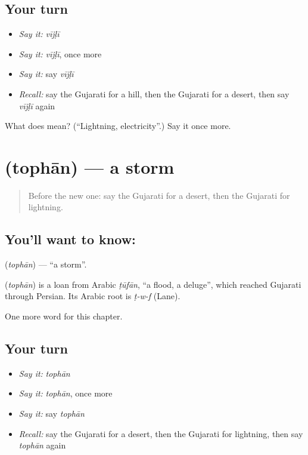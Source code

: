 \subsection*{Your turn}
\begin{itemize}
\raggedright
  \item \emph{Say it:} \emph{vījḷī}
  \item \emph{Say it:} \emph{vījḷī}, once more
  \item \emph{Say it:} say \emph{vījḷī}
  \item \emph{Recall:} say the Gujarati for a hill, then the Gujarati for a desert, then say \emph{vījḷī} again
\end{itemize}

\begin{tcolorbox}[breakable,colback=teal!4,colframe=teal!35!black,title={Before you move on}]
What does  mean? (\textquotedblleft{}Lightning, electricity\textquotedblright{}.) Say it once more.
\end{tcolorbox}
\section[\texorpdfstring{\gu{તોફાન} (tophān)}{તોફાન (tophān)}]{ (tophān) — a storm}

\label{lesson:GU-C120-tophan}



\begin{quote}
Before the new one: say the Gujarati for a desert, then the Gujarati for lightning.
\end{quote}

\subsection*{You'll want to know: }
\textbf{} (\emph{tophān}) — \textquotedblleft{}a storm\textquotedblright{}.

\begin{cousinweb}
\textbf{} (\emph{tophān}) is a loan from Arabic \emph{ṭūfān}, \textquotedblleft{}a flood, a deluge\textquotedblright{}, which reached Gujarati through Persian. Its Arabic root is \emph{ṭ-w-f} (Lane).
\end{cousinweb}

\begin{grammarlens}[title={What you've built}]
One more word for this chapter.
\end{grammarlens}

\subsection*{Your turn}
\begin{itemize}
\raggedright
  \item \emph{Say it:} \emph{tophān}
  \item \emph{Say it:} \emph{tophān}, once more
  \item \emph{Say it:} say \emph{tophān}
  \item \emph{Recall:} say the Gujarati for a desert, then the Gujarati for lightning, then say \emph{tophān} again
\end{itemize}

